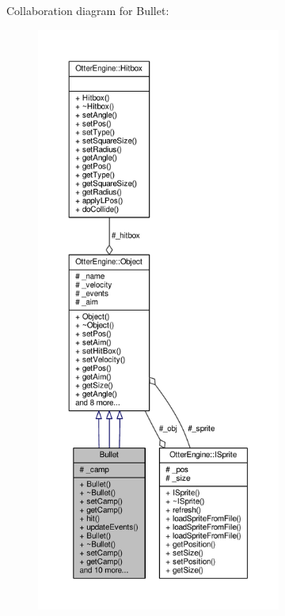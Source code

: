 Collaboration diagram for Bullet\+:\nopagebreak
\begin{figure}[H]
\begin{center}
\leavevmode
\includegraphics[height=550pt]{d6/dd5/class_bullet__coll__graph}
\end{center}
\end{figure}
